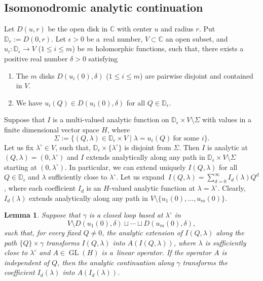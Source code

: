 \documentclass[10pt,a4paper]{article}
\numberwithin{equation}{section}
\newtheorem{Lemma}[Theorem]{Lemma}
\newcommand{\CC}{\mathbb{C}}
\begin{document}
\subsection{Isomonodromic analytic continuation}\label{sec:iso_ac}

Let $D(u,r)$ be the open disk in $\CC$ with center $u$ and radius $r$. Put $\mathbb{D}_r:= D(0,r)$. Let $\epsilon>0$ be a~real number, $V\subset \CC$ an open subset, and $u_i\colon\mathbb{D}_\epsilon \to V$ ($1\leq i\leq m$) be $m$ holomorphic functions, such that, there exists a positive real number $\delta>0$ satisfying
\begin{enumerate}\itemsep=0pt
\item[(i)]
The $m$ disks $D(u_i(0),\delta)$ ($1\leq i\leq m$) are pairwise disjoint and contained in $V$.
\item[(ii)]
We have $u_i(Q)\in D(u_i(0),\delta)$ for all $Q\in \mathbb{D}_\epsilon$.
\end{enumerate}
Suppose that $I$ is a multi-valued analytic function on $\mathbb{D}_\epsilon\times V\setminus{\Sigma}$ with values in a finite dimensional vector space $H$, where
\[
\Sigma:=\{
(Q,\lambda)\in \mathbb{D}_\epsilon\times V\mid
\lambda=u_i(Q)\ \mbox{for some $i$}
\}.
\]
Let us fix $\lambda^\circ\in V$, such that, $\mathbb{D}_\epsilon\times \{\lambda^\circ\}$ is disjoint from $\Sigma$. Then $I$ is analytic at $(Q,\lambda)=(0,\lambda^\circ)$ and $I$ extends analytically along any path in
$\mathbb{D}_\epsilon\times V\setminus{\Sigma}$ starting at $(0,\lambda^\circ)$. In particular, we can extend uniquely $I(Q,\lambda)$ for all $Q\in \mathbb{D}_\epsilon$ and $\lambda$ sufficiently close to $\lambda^\circ$.
Let us expand~${I(Q,\lambda)=\sum_{d=0}^\infty I_d(\lambda) Q^d}$, where each coefficient $I_d$ is an $H$-valued analytic function at $\lambda=\lambda^\circ$. Clearly, $I_d(\lambda)$ extends analytically along any path in $V\setminus{\{u_1(0),\dots,u_m(0)\}}$.
\begin{Lemma}\label{le:iso_ac}
Suppose that $\gamma$ is a closed loop based at $\lambda^\circ$ in
\[
V\setminus{D(u_1(0),\delta)\sqcup\cdots \sqcup D(u_m(0),\delta)},
\]
such that, for every fixed $Q\neq 0$, the analytic extension of $I(Q,\lambda)$ along the path $\{Q\}\times \gamma$ transforms $I(Q,\lambda)$ into $A(I(Q,\lambda))$, where $\lambda$ is sufficiently close to $\lambda^\circ$ and $A\in \operatorname{GL}(H)$ is a~linear operator. If the operator $A$ is independent of $Q$, then the analytic continuation along $\gamma$ transforms the coefficient $I_d(\lambda)$ into $A(I_d(\lambda))$.
\end{Lemma}
\end{document}
